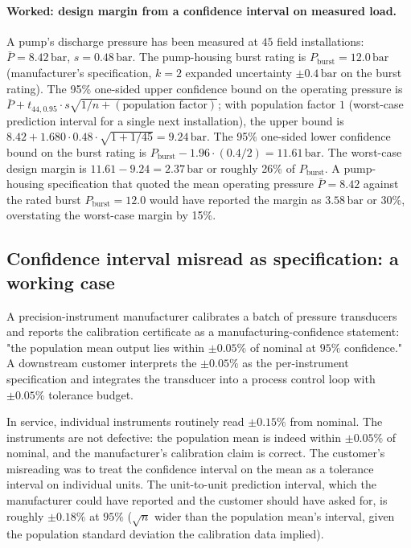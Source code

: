 \paragraph{Worked: design margin from a confidence interval on
measured load.} A pump's discharge pressure has been measured at
$45$ field installations: $\bar{P} = 8.42\,\si{\bar}$, $s = 0.48
\,\si{\bar}$. The pump-housing burst rating is
$P_{\text{burst}} = 12.0\,\si{\bar}$ (manufacturer's specification,
$k = 2$ expanded uncertainty $\pm 0.4\,\si{\bar}$ on the burst
rating). The 95\% one-sided upper confidence bound on the
operating pressure is
$\bar{P} + t_{44, 0.95} \cdot s\sqrt{1/n + (\text{population
factor})}$; with population factor $1$ (worst-case prediction
interval for a single next installation), the upper bound is
$8.42 + 1.680 \cdot 0.48 \cdot \sqrt{1 + 1/45} = 9.24\,\si{\bar}$.
The 95\% one-sided lower confidence bound on the burst rating is
$P_{\text{burst}} - 1.96 \cdot (0.4/2) = 11.61\,\si{\bar}$. The
worst-case design margin is $11.61 - 9.24 = 2.37\,\si{\bar}$ or
roughly 26\% of $P_{\text{burst}}$. A pump-housing specification
that quoted the mean operating pressure $\bar{P} = 8.42$ against
the rated burst $P_{\text{burst}} = 12.0$ would have reported the
margin as $3.58\,\si{\bar}$ or 30\%, overstating the worst-case
margin by 15\%.

\subsection{Confidence interval misread as specification: a working case}

A precision-instrument manufacturer calibrates a batch of pressure
transducers and reports the calibration certificate as a
manufacturing-confidence statement: "the population mean output
lies within $\pm 0.05\%$ of nominal at $95\%$ confidence." A
downstream customer interprets the $\pm 0.05\%$ as the
per-instrument specification and integrates the transducer into a
process control loop with $\pm 0.05\%$ tolerance budget.

In service, individual instruments routinely read $\pm 0.15\%$ from
nominal. The instruments are not defective: the population mean is
indeed within $\pm 0.05\%$ of nominal, and the manufacturer's
calibration claim is correct. The customer's misreading was to
treat the confidence interval on the mean as a tolerance interval
on individual units. The unit-to-unit prediction interval, which the
manufacturer could have reported and the customer should have asked
for, is roughly $\pm 0.18\%$ at $95\%$ ($\sqrt{n}$ wider than the
population mean's interval, given the population standard deviation
the calibration data implied).

